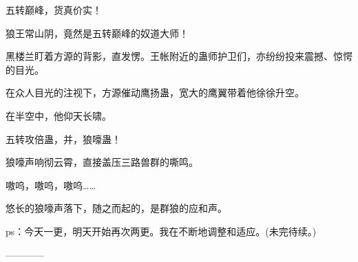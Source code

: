 \begin{this_body}
五转巅峰，货真价实！

狼王常山阴，竟然是五转巅峰的奴道大师！

黑楼兰盯着方源的背影，直发愣。王帐附近的蛊师护卫们，亦纷纷投来震撼、惊愕的目光。

在众人目光的注视下，方源催动鹰扬蛊，宽大的鹰翼带着他徐徐升空。

在半空中，他仰天长啸。

五转攻倍蛊，并，狼嚎蛊！

狼嚎声响彻云霄，直接盖压三路兽群的嘶鸣。

嗷呜，嗷呜，嗷呜……

悠长的狼嚎声落下，随之而起的，是群狼的应和声。

ps：今天一更，明天开始再次两更。我在不断地调整和适应。(未完待续。)

------------

\end{this_body}

